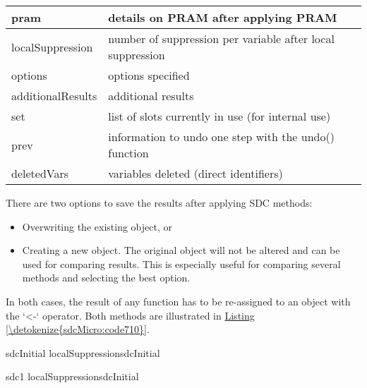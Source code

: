 \documentclass[letterpaper,10pt,english]{sphinxmanual}
\begin{document}
\begin{savenotes}
\begin{tabulary}{\linewidth}[t]{|T|T|}
\hline
pram
&
details on PRAM after applying
PRAM
\\
\hline
localSuppression
&
number of suppression per
variable after local suppression
\\
\hline
options
&
options specified
\\
\hline
additionalResults
&
additional results
\\
\hline
set
&
list of slots currently in use
(for internal use)
\\
\hline
prev
&
information to undo one step with
the undo() function
\\
\hline
deletedVars
&
variables deleted (direct
identifiers)
\\
\hline
\end{tabulary}
\par
\sphinxattableend\end{savenotes}

There are two options to save the results after applying SDC methods:
\begin{itemize}
\item {} 
Overwriting the existing  object, or

\item {} 
Creating a new  object. The original object will not be
altered and can be used for comparing results. This is especially
useful for comparing several methods and selecting the best option.

\end{itemize}

In both cases, the result of any function has to be re-assigned to an
object with the ‘\textless{}-‘ operator. Both methods are illustrated in
\hyperref[\detokenize{sdcMicro:code710}]{Listing \ref{\detokenize{sdcMicro:code710}}}.

\def\sphinxLiteralBlockLabel{\label{\detokenize{sdcMicro:code710}}}
%
\begin{sphinxVerbatim}[commandchars=\\\{\},numbers=left,firstnumber=1,stepnumber=1]
sdcInitial  localSuppressionsdcInitial

sdc1  localSuppressionsdcInitial
\end{sphinxVerbatim}
\end{document}
